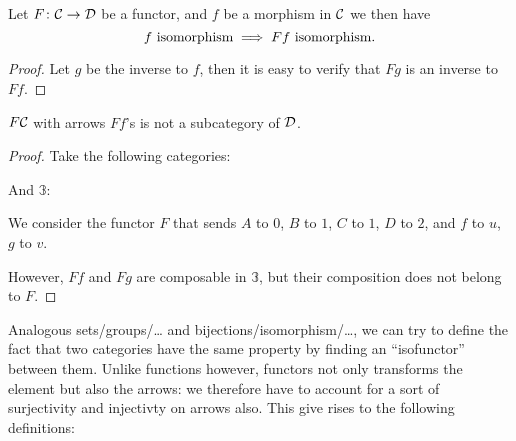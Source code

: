 \documentclass[a4paper]{article}
\theoremstyle { remark }
\newtheorem { warning } { Warning }
\theoremstyle { definition }
\theoremstyle { plain }
\newtheorem { lemma } { Lemma }
\begin{document}
\begin{lemma}
Let \( F \colon  \mathcal { C }  \to  \mathcal { D }  \) be a functor, and \( f \) be a morphism in \(  \mathcal { C }  \) we then have
\[
  \text{\( f \) isomorphism} \implies \text{\( F f \) isomorphism}.
\]

\begin{proof}
Let \( g \) be the inverse to \( f \), then it is easy to verify that \( F g \) is an inverse to \( F f \).
\end{proof}
\end{lemma}

\begin{warning}
\( F  \mathcal { C }  \) with arrows \( F f \)'s is not a subcategory of \(  \mathcal { D }  \).

\begin{proof}
Take the following categories:

\begin{center}
\end{center}

And \( \mathbb{3} \):

We consider the functor \( F \) that sends \( A \) to \( 0 \), \( B \) to \( 1 \), \( C \) to \( 1 \), \( D \) to \( 2 \), and \( f \) to \( u \), \( g \) to \( v \).

However, \( F f \) and \( F g \) are composable in \( \mathbb{3} \), but their composition does not belong to \( F \).
\end{proof}
\end{warning}

Analogous sets/groups/… and bijections/isomorphism/…, we can try to define the fact that two categories have the same property by finding an \enquote{isofunctor} between them.
Unlike functions however, functors not only transforms the element but also the arrows: we therefore have to account for a sort of surjectivity and injectivty on arrows also.
This give rises to the following definitions:
\end{document}
